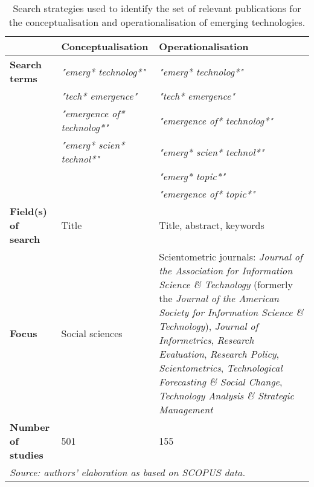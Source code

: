 \documentclass[11pt]{article}
\begin{document}
\setlength{\tabcolsep}{10pt}
\renewcommand{\arraystretch}{1.5}
\begin{table}[h]\footnotesize
	\caption{\label{tab:searches}Search strategies used to identify the set of relevant publications for the conceptualisation and operationalisation of emerging technologies.}
	\centering
{\begin{tabular}{lp{4cm}p{6cm}}
\hline\hline
\textbf{ }&	\textbf{Conceptualisation} & 							\textbf{Operationalisation} \\
\hline
\textbf{Search terms }&		\textit{"emerg* technolog*"} & 								\textit{"emerg* technolog*"} \\
  &						\textit{"tech* emergence"} &								\textit{"tech* emergence"} \\
  &						\textit{"emergence of* technolog*"} &							\textit{"emergence of* technolog*"} \\
  &						 \textit{"emerg* scien* technol*"} &							\textit{"emerg* scien* technol*"} \\
  &												&							\textit{"emerg* topic*"} \\
  &												&							\textit{"emergence of* topic*"} \\
\textbf{Field(s) of search} 		&	Title												& Title, abstract, keywords	 \\
\textbf{Focus} &	Social sciences	& Scientometric journals: \textit{Journal of the Association for Information Science \& Technology} (formerly the \textit{Journal of the American Society for Information Science \& Technology}), \textit{Journal of Informetrics}, \textit{Research Evaluation}, \textit{Research Policy}, \textit{Scientometrics}, \textit{Technological Forecasting \& Social Change}, \textit{Technology Analysis \& Strategic Management}\\
\textbf{Number of studies} 	&	501					&							155\\
\hline


\hline\hline
\multicolumn{3}{l}{\footnotesize \textit{Source: authors' elaboration as based on SCOPUS data.}}
\end{tabular}
}
\end{table}
\end{document}
